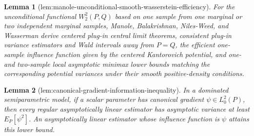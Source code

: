 \documentclass{article}
\newtheorem{lemma}{Lemma}
\begin{document}
\begin{lemma}[lem:manole-unconditional-smooth-wasserstein-efficiency]\label{lem:manole-unconditional-smooth-wasserstein-efficiency}
For the unconditional functional \(W_2^2(P,Q)\) based on one sample from one marginal or two independent marginal samples, Manole, Balakrishnan, Niles-Weed, and Wasserman derive centered plug-in central limit theorems, consistent plug-in variance estimators and Wald intervals away from \(P=Q\), the efficient one-sample influence function given by the centered Kantorovich potential, and one- and two-sample local asymptotic minimax lower bounds matching the corresponding potential variances under their smooth positive-density conditions.
\end{lemma}

\begin{lemma}[lem:canonical-gradient-information-inequality]\label{lem:canonical-gradient-information-inequality}
In a dominated semiparametric model, if a scalar parameter has canonical gradient \(\psi\in L_0^2(P)\), then every regular asymptotically linear estimator has asymptotic variance at least \(E_P[\psi^2]\). An asymptotically linear estimator whose influence function is \(\psi\) attains this lower bound.
\end{lemma}
\end{document}
